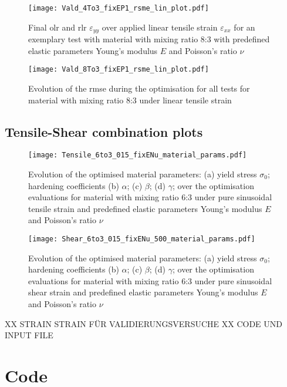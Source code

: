 \begin{appendices}
    \begin{figure}[H]
    \centering
    \texttt{[image: Vald\_4To3\_fixEP1\_rsme\_lin\_plot.pdf]}
    \caption{Final \acrlong{olr} and \acrfull{rlr} $\varepsilon_{yy}$ over applied linear tensile strain $\varepsilon_{xx}$ for an exemplary test with material with mixing ratio 8:3 with predefined elastic parameters Young's modulus $E$ and Poisson's ratio $\nu$}
    \label{fig:strain_strain_8to3}
    \end{figure}

    \begin{figure}[H]
    \centering
    \texttt{[image: Vald\_8To3\_fixEP1\_rsme\_lin\_plot.pdf]}
    \caption{Evolution of the \acrfull{rmse} during the optimisation for all tests for material with mixing ratio 8:3 under linear tensile strain}
    \label{fig:verfifRMSE83}
    \end{figure}


    \section{Tensile-Shear combination plots} \label{app:tensileShearResults}
    \begin{figure}[H]
    \centering
    \texttt{[image: Tensile\_6to3\_015\_fixENu\_material\_params.pdf]}
    \caption{Evolution of the optimised material parameters: (a) yield stress $\sigma_0$; hardening coefficients (b) $\alpha$; (c) $\beta$; (d) $\gamma$; over the optimisation evaluations for material with mixing ratio 6:3 under pure sinusoidal tensile strain and predefined elastic parameters Young's modulus $E$ and Poisson's ratio $\nu$}
    \label{fig:tensileMatParams}
    \end{figure}

    \begin{figure}[H]
    \centering
    \texttt{[image: Shear\_6to3\_015\_fixENu\_500\_material\_params.pdf]}
    \caption{Evolution of the optimised material parameters: (a) yield stress $\sigma_0$; hardening coefficients (b) $\alpha$; (c) $\beta$; (d) $\gamma$; over the optimisation evaluations for material with mixing ratio 6:3 under pure sinusoidal shear strain and predefined elastic parameters Young's modulus $E$ and Poisson's ratio $\nu$}
    \label{fig:shearMatParams}
    \end{figure}


    XX STRAIN STRAIN FÜR VALIDIERUNGSVERSUCHE
    XX CODE UND INPUT FILE
    \chapter{Code} \label{app:Code}

\end{appendices}
